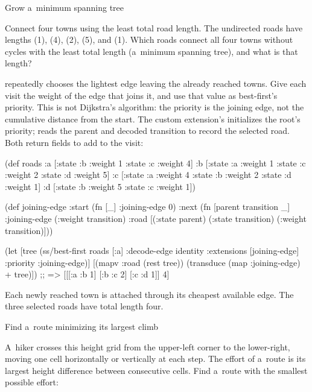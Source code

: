 {{{\secc Grow a~minimum spanning tree

 Connect four towns using the least total road length.
The undirected roads have lengths  (1),  (4),
 (2),  (5), and  (1). Which roads
connect all four towns without cycles with the least total length
(a~minimum spanning tree), and what is that length?

\smallskip
{}
repeatedly chooses the lightest edge leaving the already reached towns.
Give each visit the weight of the
edge that joins it, and use that value as best-first's priority. This is
not Dijkstra's algorithm: the priority is the joining edge, not the
cumulative distance from the start. The custom extension's 
initializes the root's priority;  reads the parent and decoded
transition to record the selected road. Both return fields to add to the
visit:

\begtt {}
(def roads
  {:a [{:state :b :weight 1} {:state :c :weight 4}]
   :b [{:state :a :weight 1} {:state :c :weight 2}
       {:state :d :weight 5}]
   :c [{:state :a :weight 4} {:state :b :weight 2}
       {:state :d :weight 1}]
   :d [{:state :b :weight 5} {:state :c :weight 1}]})

(def joining-edge
  {:start (fn [_] {:joining-edge 0})
   :next (fn [parent transition _]
           {:joining-edge (:weight transition)
            :road [(:state parent) (:state transition)
                   (:weight transition)]})})

(let [tree (ss/best-first roads [:a]
                              {:decode-edge identity
                               :extensions [joining-edge]
                               :priority :joining-edge})]
  [(mapv :road (rest tree))
   (transduce (map :joining-edge) + tree)])
;; => [[[:a :b 1] [:b :c 2] [:c :d 1]] 4]
\endtt

Each newly reached town is attached through its cheapest available edge.
The three selected roads have total length four.

\secc Find a~route minimizing its largest climb

 A~hiker crosses this height grid from the upper-left
corner to the lower-right, moving one cell horizontally or vertically at
each step. The effort of a~route is its largest height difference between
consecutive cells. Find a~route with the smallest possible effort:

}}}
